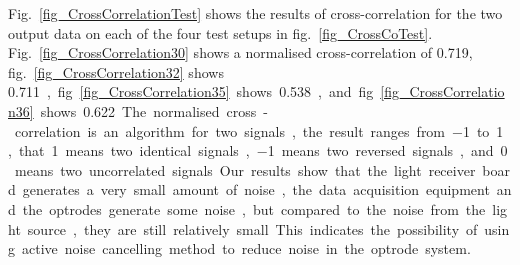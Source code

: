 Fig.~\ref{fig_CrossCorrelationTest} shows the results of cross-correlation for the two output data on each of the four test setups in fig.~\ref{fig_CrossCoTest}.  Fig.~\ref{fig_CrossCorrelation30} shows a normalised cross-correlation of \qty{0.719}{}, fig.~\ref{fig_CrossCorrelation32} shows \qty{0.711}, fig.~\ref{fig_CrossCorrelation35} shows \qty{0.538}, and fig.~\ref{fig_CrossCorrelation36} shows \qty{0.622}.  The normalised cross-correlation is an algorithm for two signals, the result ranges from \qty{-1}{} to \qty{1}{}, that \qty{1}{} means two identical signals, \qty{-1}{} means two reversed signals, and \qty{0}{} means two uncorrelated signals.  Our results show that the light receiver board generates a very small amount of noise, the data acquisition equipment and the optrodes generate some noise, but compared to the noise from the light source, they are still relatively small.  This indicates the possibility of using active noise cancelling method to reduce noise in the optrode system.

